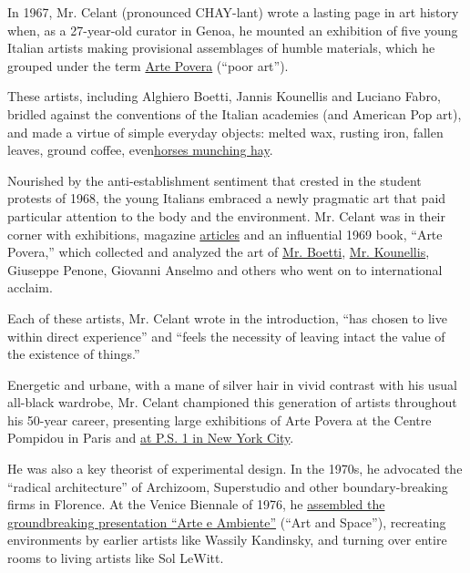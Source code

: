In 1967, Mr. Celant (pronounced CHAY-lant) wrote a lasting page in art
history when, as a 27-year-old curator in Genoa, he mounted an
exhibition of five young Italian artists making provisional assemblages
of humble materials, which he grouped under the term
\href{https://www.moma.org/collection/terms/7}{Arte Povera} (``poor
art'').

These artists, including Alghiero Boetti, Jannis Kounellis and Luciano
Fabro, bridled against the conventions of the Italian academies (and
American Pop art), and made a virtue of simple everyday objects: melted
wax, rusting iron, fallen leaves, ground coffee,
even\href{https://www.nytimes.com/2015/06/26/arts/design/review-art-that-snorts-from-jannis-kounellis-at-gavin-browns-enterprise.html}{horses
munching hay}.

Nourished by the anti-establishment sentiment that crested in the
student protests of 1968, the young Italians embraced a newly pragmatic
art that paid particular attention to the body and the environment. Mr.
Celant was in their corner with exhibitions, magazine
\href{https://flash---art.com/article/germano-celant-arte-povera-notes-on-a-guerrilla-war/}{articles}
and an influential 1969 book, ``Arte Povera,'' which collected and
analyzed the art of
\href{https://www.nytimes.com/2012/06/29/arts/design/alighiero-boetti-retrospective-at-museum-of-modern-art.html}{Mr.
Boetti},
\href{https://www.nytimes.com/2017/02/21/arts/design/jannis-kounellis-died-sculptor.html}{Mr.
Kounellis}, Giuseppe Penone, Giovanni Anselmo and others who went on to
international acclaim.

Each of these artists, Mr. Celant wrote in the introduction, ``has
chosen to live within direct experience'' and ``feels the necessity of
leaving intact the value of the existence of things.''

Energetic and urbane, with a mane of silver hair in vivid contrast with
his usual all-black wardrobe, Mr. Celant championed this generation of
artists throughout his 50-year career, presenting large exhibitions of
Arte Povera at the Centre Pompidou in Paris and
\href{https://www.nytimes.com/1985/10/13/arts/conceptual-art-italian-style-makes-a-statement-at-ps-1.html}{at
P.S. 1 in New York City}.

He was also a key theorist of experimental design. In the 1970s, he
advocated the ``radical architecture'' of Archizoom, Superstudio and
other boundary-breaking firms in Florence. At the Venice Biennale of
1976, he
\href{https://www.nytimes.com/1976/07/25/archives/the-biennale-a-show-of-compromises.html}{assembled
the groundbreaking presentation ``Arte e Ambiente''} (``Art and
Space''), recreating environments by earlier artists like Wassily
Kandinsky, and turning over entire rooms to living artists like Sol
LeWitt.

